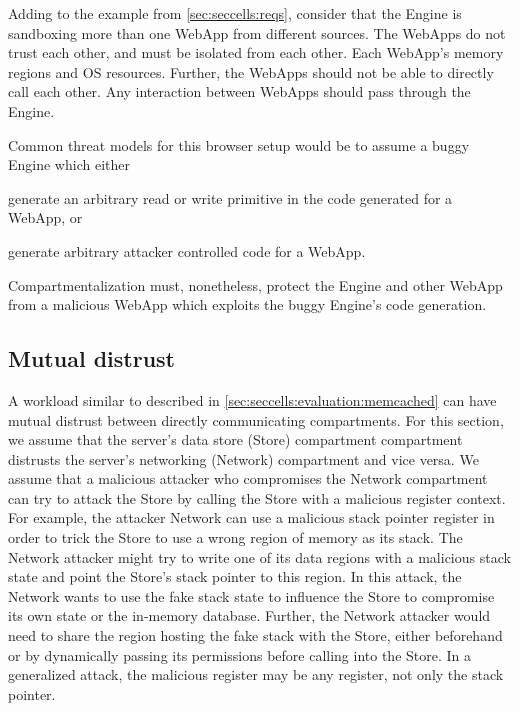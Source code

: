 Adding to the example from \autoref{sec:seccells:reqs}, consider that the
Engine is sandboxing more than one WebApp from different sources.
The WebApps do not trust each other, and must be isolated from each other.
Each WebApp's memory regions and OS resources.
Further, the WebApps should not be able to directly call each other.
Any interaction between WebApps should pass through the Engine.

Common threat models for this browser setup would be to assume a buggy Engine
which either
\begin{inparaenum}
      \item generate an arbitrary read or write primitive in the code generated
            for a WebApp, or 
      \item generate arbitrary attacker controlled code for a WebApp.
\end{inparaenum}
Compartmentalization must, nonetheless, protect the Engine and other WebApp 
from a malicious WebApp which exploits the buggy Engine's code generation.

\subsection{Mutual distrust} 
\label{sec:compreview:usecases:distrust}
A workload similar to  described in 
\autoref{sec:seccells:evaluation:memcached} can have mutual distrust
between directly communicating compartments.
For this section, we assume that the server's data store (Store) compartment
compartment distrusts the server's networking (Network) compartment and
vice versa.
We assume that a malicious attacker who compromises the Network compartment
can try to attack the Store by calling the Store with a malicious register
context.
For example, the attacker Network can use a malicious stack pointer register 
in order to trick the Store to use a wrong region of memory as its stack.
The Network attacker might try to write one of its data regions with a malicious
stack state and point the Store's stack pointer to this region.
In this attack, the Network wants to use the fake stack state to influence the
Store to compromise its own state or the in-memory database.
Further, the Network attacker would need to share the region hosting the fake
stack with the Store, either beforehand or by dynamically passing its 
permissions before calling into the Store.
In a generalized attack, the malicious register may be any register, not
only the stack pointer.

